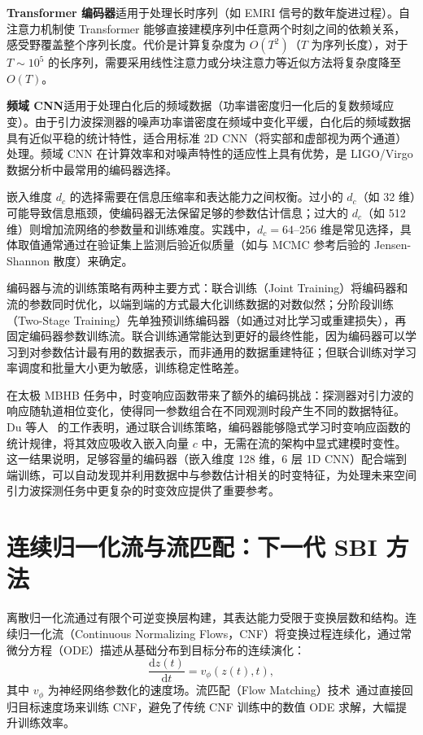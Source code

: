 \textbf{Transformer 编码器}适用于处理长时序列（如 EMRI 信号的数年旋进过程）。自注意力机制使 Transformer 能够直接建模序列中任意两个时刻之间的依赖关系，感受野覆盖整个序列长度。代价是计算复杂度为 $O(T^2)$（$T$ 为序列长度），对于 $T \sim 10^5$ 的长序列，需要采用线性注意力或分块注意力等近似方法将复杂度降至 $O(T)$。

\textbf{频域 CNN}适用于处理白化后的频域数据（功率谱密度归一化后的复数频域应变）。由于引力波探测器的噪声功率谱密度在频域中变化平缓，白化后的频域数据具有近似平稳的统计特性，适合用标准 2D CNN（将实部和虚部视为两个通道）处理。频域 CNN 在计算效率和对噪声特性的适应性上具有优势，是 LIGO/Virgo 数据分析中最常用的编码器选择。

嵌入维度 $d_c$ 的选择需要在信息压缩率和表达能力之间权衡。过小的 $d_c$（如 32 维）可能导致信息瓶颈，使编码器无法保留足够的参数估计信息；过大的 $d_c$（如 512 维）则增加流网络的参数量和训练难度。实践中，$d_c = 64$--$256$ 维是常见选择，具体取值通常通过在验证集上监测后验近似质量（如与 MCMC 参考后验的 Jensen-Shannon 散度）来确定。

编码器与流的训练策略有两种主要方式：联合训练（Joint Training）将编码器和流的参数同时优化，以端到端的方式最大化训练数据的对数似然；分阶段训练（Two-Stage Training）先单独预训练编码器（如通过对比学习或重建损失），再固定编码器参数训练流。联合训练通常能达到更好的最终性能，因为编码器可以学习到对参数估计最有用的数据表示，而非通用的数据重建特征；但联合训练对学习率调度和批量大小更为敏感，训练稳定性略差。

在太极 MBHB 任务中，时变响应函数带来了额外的编码挑战：探测器对引力波的响应随轨道相位变化，使得同一参数组合在不同观测时段产生不同的数据特征。Du 等人~\cite{du2024normflow} 的工作表明，通过联合训练策略，编码器能够隐式学习时变响应函数的统计规律，将其效应吸收入嵌入向量 $c$ 中，无需在流的架构中显式建模时变性。这一结果说明，足够容量的编码器（嵌入维度 128 维，6 层 1D CNN）配合端到端训练，可以自动发现并利用数据中与参数估计相关的时变特征，为处理未来空间引力波探测任务中更复杂的时变效应提供了重要参考。

\section{连续归一化流与流匹配：下一代 SBI 方法}

离散归一化流通过有限个可逆变换层构建，其表达能力受限于变换层数和结构。连续归一化流（Continuous Normalizing Flows，CNF）将变换过程连续化，通过常微分方程（ODE）描述从基础分布到目标分布的连续演化：
\begin{equation}
  \frac{\mathrm{d}z(t)}{\mathrm{d}t} = v_\phi(z(t), t),
\end{equation}
其中 $v_\phi$ 为神经网络参数化的速度场。流匹配（Flow Matching）技术~\cite{Lipman2022FlowMatching}通过直接回归目标速度场来训练 CNF，避免了传统 CNF 训练中的数值 ODE 求解，大幅提升训练效率。

